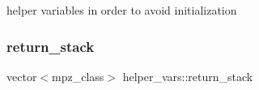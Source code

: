 helper variables in order to avoid initialization 

\mbox{\label{namespacehelper__vars_a36577c81e805c58ec2ec7ed63882317f}} 
\subsubsection{\texorpdfstring{return\+\_\+stack}{return\_stack}}
{\footnotesize\ttfamily vector$<$mpz\+\_\+class$>$ helper\+\_\+vars\+::return\+\_\+stack}

